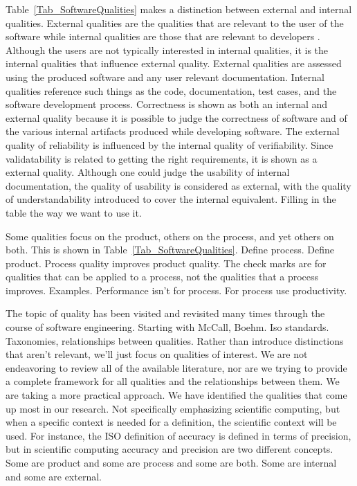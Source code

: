 \documentclass[letterpaper, cleveref]{lipics-v2019}
\theoremstyle{definition}
\begin{document}
Table~\ref{Tab_SoftwareQualities} makes a distinction between external and
internal qualities.  External qualities are the qualities that are relevant to
the user of the software while internal qualities are those that are relevant to
developers \citep[p.\ 16]{GhezziEtAl2003}.  Although the users are not typically
interested in internal qualities, it is the internal qualities that influence
external quality.  External qualities are assessed using the produced software
and any user relevant documentation.  Internal qualities reference such things
as the code, documentation, test cases, and the software development process.
Correctness is shown as both an internal and external quality because it is
possible to judge the correctness of software and of the various internal
artifacts produced while developing software.  The external quality of
reliability is influenced by the internal quality of verifiability.  Since
validatability is related to getting the right requirements, it is shown as a
external quality.  Although one could judge the usability of internal
documentation, the quality of usability is considered as external, with the
quality of understandability introduced to cover the internal equivalent.
Filling in the table the way we want to use it.

Some qualities focus on the product, others on the process, and yet others on
both.  This is shown in Table~\ref{Tab_SoftwareQualities}.  Define process.
Define product. Process quality improves product quality.  The check marks are
for qualities that can be applied to a process, not the qualities that a process
improves.  Examples.  Performance isn't for process.  For process use
productivity.



The topic of quality has been visited and revisited many times through the
course of software engineering.  Starting with McCall, Boehm.  Iso standards.
Taxonomies, relationships between qualities.  Rather than introduce distinctions
that aren't relevant, we'll just focus on qualities of interest. We are not
endeavoring to review all of the available literature, nor are we trying to
provide a complete framework for all qualities and the relationships between
them.  We are taking a more practical approach.  We have identified the
qualities that come up most in our research.  Not specifically emphasizing
scientific computing, but when a specific context is needed for a definition,
the scientific context will be used.  For instance, the ISO definition of
accuracy is defined in terms of precision, but in scientific computing accuracy
and precision are two different concepts.  Some are product and some are process
and some are both.  Some are internal and some are external.
\end{document}
